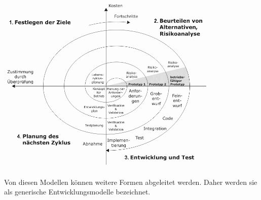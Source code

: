 \begin{center}
    \includegraphics[width=0.8\textwidth]{Grafiken/Spiralmodel_nach_Boehm.png}
    \label{Grafik:Spiralmodell nach Boehm}
\end{center}

Von diesen Modellen können weitere Formen abgeleitet werden. Daher werden sie als generische Entwicklungsmodelle bezeichnet.